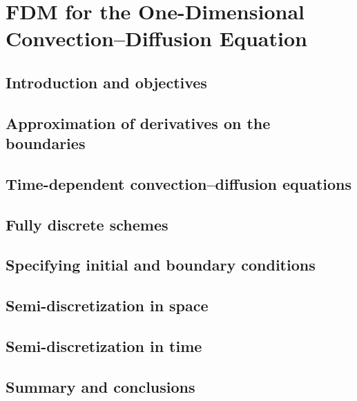 \chapter{FDM for the One-Dimensional Convection–Diffusion Equation}

\section{Introduction and objectives}

\section{Approximation of derivatives on the boundaries}

\section{Time-dependent convection–diffusion equations}

\section{Fully discrete schemes}

\section{Specifying initial and boundary conditions}

\section{Semi-discretization in space}

\section{Semi-discretization in time}

\section{Summary and conclusions}